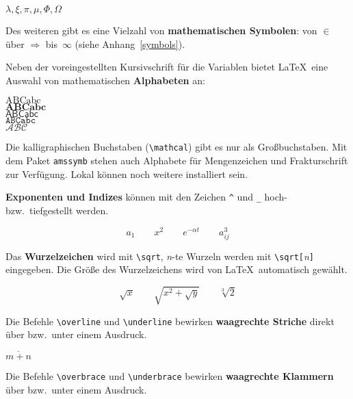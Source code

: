 \begin{LTXexample}
$\lambda, \xi, \pi, \mu,
 \Phi, \Omega $
\end{LTXexample}


Des weiteren gibt es eine Vielzahl von \textbf{mathematischen Symbolen}:
von $\in$ über $\Rightarrow$ bis~$\infty$ (siehe
Anhang~\vref{symbols}).

\bigskip

Neben der voreingestellten Kursivschrift für die Variablen
bietet \LaTeX\ eine Auswahl von mathematischen \textbf{Alphabeten} an:
\begin{LTXexample}
$\mathrm{ABCabc}$ \\
$\mathbf{ABCabc}$ \\
$\mathsf{ABCabc}$ \\
$\mathtt{ABCabc}$ \\
$\mathcal{ABC}$
\end{LTXexample}

Die kalligraphischen Buchstaben (\lstinline:\mathcal:) gibt es nur als
Großbuchstaben. Mit dem Paket \texttt{amssymb} \cite{ch8} stehen
auch Alphabete für Mengenzeichen und Frakturschrift zur Verfügung.
Lokal können noch weitere installiert sein.


\bigskip

\textbf{Exponenten und Indizes} können mit den Zeichen \lstinline|^|
und \lstinline|_| hoch- bzw.\ tiefgestellt werden.

\begin{LTXexample}
\[
a_{1} \qquad x^{2} \qquad
 e^{-\alpha t} \qquad a^{3}_{ij}
\]
\end{LTXexample}


Das \textbf{Wurzelzeichen} wird mit \lstinline|\sqrt|, \textit{n}-te
Wurzeln werden mit \lstinline|\sqrt[|\textit{n}\lstinline|]| eingegeben.
Die Größe des Wurzelzeichens wird von \LaTeX\ automatisch
gewählt.

\begin{LTXexample}
\[
\sqrt{x} \qquad  \sqrt{ x^{2}+\sqrt{y} }
   \qquad \sqrt[3]{2}
\]
\end{LTXexample}

Die Befehle \lstinline|\overline| und \lstinline|\underline| bewirken
\textbf{waagrechte Striche} direkt über bzw.\ unter einem
Ausdruck.
\begin{LTXexample}
$\overline{m+n}$
\end{LTXexample}

Die Befehle \lstinline|\overbrace| und \lstinline|\underbrace| bewirken
\textbf{waagrechte Klammern} über bzw.\ unter einem Ausdruck.

